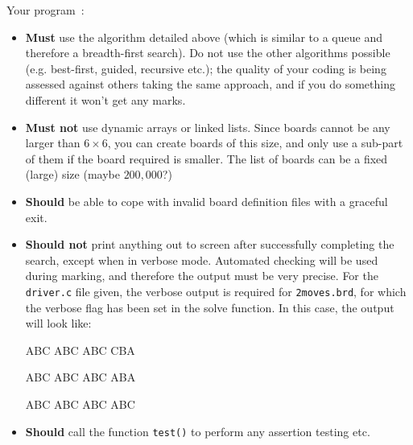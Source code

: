 \begin{exercise}
\noindent
Your program~:
\begin{itemize}
\item {\bf Must} use the algorithm detailed above (which is similar to a queue and therefore a breadth-first search). Do not use the other algorithms possible (e.g. best-first, guided, recursive etc.); the quality of your coding is being assessed against others taking the same approach, and if you do something different it won't get any marks.
\item {\bf Must not} use dynamic arrays or linked lists. Since boards cannot be any larger than $6 \times 6$, you can create boards of this size, and only use a sub-part of them if the board required is smaller. The list of boards can be a fixed (large) size (maybe $200,000$?)
\item {\bf Should} be able to cope with invalid board definition files with a graceful exit.
\item {\bf Should not} print anything out to screen after successfully
completing the search, except when in verbose mode. Automated checking
will be used during marking, and therefore the output must be very precise.
For the \verb^driver.c^ file given, the verbose output is required for
\verb^2moves.brd^, for which the verbose flag has been set in the 
solve function. In this case, the output will look like:
\begin{codesnippet}
ABC
ABC
ABC
CBA

ABC
ABC
ABC
ABA

ABC
ABC
ABC
ABC
\end{codesnippet}

\item {\bf Should} call the function \verb^test()^ to perform any assertion testing etc.
\end{itemize}

\end{exercise}
